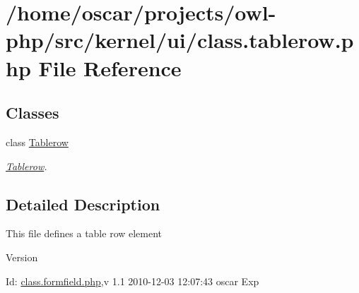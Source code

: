 \section{/home/oscar/projects/owl-\/php/src/kernel/ui/class.tablerow.php File Reference}
\label{class_8tablerow_8php}
\subsection*{Classes}
\begin{DoxyCompactItemize}
\item 
class \hyperlink{classTablerow}{Tablerow}
\begin{DoxyCompactList}\small\item\em \hyperlink{classTablerow}{Tablerow}. \item\end{DoxyCompactList}\end{DoxyCompactItemize}


\subsection{Detailed Description}
This file defines a table row element \begin{DoxyVersion}{Version}

\end{DoxyVersion}
\begin{DoxyParagraph}{Id:}
\hyperlink{class_8formfield_8php}{class.formfield.php},v 1.1 2010-\/12-\/03 12:07:43 oscar Exp 
\end{DoxyParagraph}
